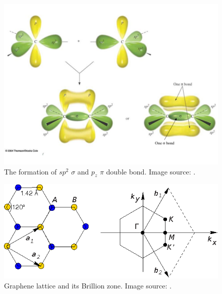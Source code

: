 \begin{figure}[htbp!] 
\centering  
\includegraphics[width=\textwidth]{double_bond}
\caption{The formation of $sp^2$ $\sigma$ and $p_z$ $\pi$ double bond. Image source: \cite{gra_bond}. }  
\label{fig:gra_bond}
\end{figure} 



\begin{figure}[htbp!] 
\centering  
\includegraphics[width=\textwidth]{gra_lat.eps}
\caption{Graphene lattice and its Brillion zone. Image source: \cite{CastroNeto2009}. }  
\label{fig:gra_lat}
\end{figure} 

